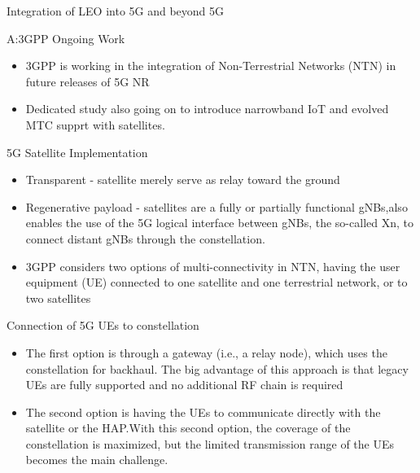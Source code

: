 \documentclass{beamer}
\begin{document}
\begin{frame}{Integration of LEO into 5G and beyond 5G}
\begin{block}{A:3GPP Ongoing Work}
\begin{itemize}
    \item  3GPP is working in the integration of Non-Terrestrial Networks (NTN) in future releases of 5G NR
    \item Dedicated study also going on to introduce narrowband IoT and evolved MTC supprt with satellites.
\end{itemize}
\end{block}
\begin{block}{5G Satellite Implementation}
\begin{itemize}
    \item Transparent - satellite merely serve as relay toward the ground 
    \item Regenerative payload  - satellites are a fully or partially functional gNBs,also enables the
use of the 5G logical interface between gNBs, the so-called
Xn, to connect distant gNBs through the constellation. 
\item 3GPP considers two options of multi-connectivity
in NTN, having the user equipment (UE) connected to one
satellite and one terrestrial network, or to two satellites
\end{itemize}

\end{block}
\end{frame}

\begin{frame}
 \begin{block}{Connection of 5G UEs to constellation}
 \begin{itemize}
     \item The first option is through a gateway
(i.e., a relay node), which uses the constellation for backhaul.
The big advantage of this approach is that legacy
UEs are fully supported and no additional RF chain is
required
\item The second option is having the UEs to communicate
directly with the satellite or the HAP.With this second
option, the coverage of the constellation is maximized, but
the limited transmission range of the UEs becomes the main
challenge.
 \end{itemize}
 \end{block}   
\end{frame}
\end{document}
